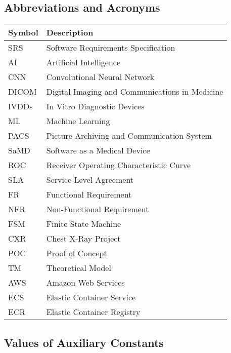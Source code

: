 \documentclass[12pt, titlepage]{article}
\begin{document}
\subsection{Abbreviations and Acronyms}
\renewcommand{\arraystretch}{1.3}
\noindent \begin{tabular}{l l} 
  \toprule		
  \textbf{Symbol} & \textbf{Description}\\
  \midrule 
  SRS & Software Requirements Specification\\
  AI & Artificial Intelligence\\
  CNN & Convolutional Neural Network\\
  DICOM & Digital Imaging and Communications in Medicine\\
  IVDDs & In Vitro Diagnostic Devices\\
  ML & Machine Learning\\
  PACS & Picture Archiving and Communication System\\
  SaMD & Software as a Medical Device\\
  ROC & Receiver Operating Characteristic Curve\\
  SLA & Service-Level Agreement\\
  FR & Functional Requirement\\
  NFR & Non-Functional Requirement\\
  FSM & Finite State Machine\\
  CXR & Chest X-Ray Project\\
  POC & Proof of Concept\\
  TM & Theoretical Model\\
  AWS & Amazon Web Services\\
  ECS & Elastic Container Service\\
  ECR & Elastic Container Registry\\
  \bottomrule
\end{tabular}
\newpage
\subsection{Values of Auxiliary Constants}
\end{document}
